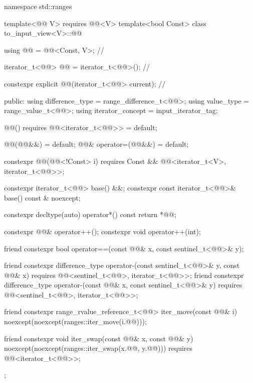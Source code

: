 %
\begin{codeblock}
namespace std::ranges {
  template<@@ V>
    requires @@<V>
  template<bool Const>
  class to_input_view<V>::@@ {
    using @@ = @@<Const, V>;                         // \expos

    iterator_t<@@> @@ = iterator_t<@@>();             // \expos

    constexpr explicit @@(iterator_t<@@> current);      // \expos

  public:
    using difference_type = range_difference_t<@@>;
    using value_type = range_value_t<@@>;
    using iterator_concept = input_iterator_tag;

    @@() requires @@<iterator_t<@@>> = default;

    @@(@@&&) = default;
    @@& operator=(@@&&) = default;

    constexpr @@(@@<!Const> i)
      requires Const && @@<iterator_t<V>, iterator_t<@@>>;

    constexpr iterator_t<@@> base() &&;
    constexpr const iterator_t<@@>& base() const & noexcept;

    constexpr decltype(auto) operator*() const { return *@@; }

    constexpr @@& operator++();
    constexpr void operator++(int);

    friend constexpr bool operator==(const @@& x, const sentinel_t<@@>& y);

    friend constexpr difference_type operator-(const sentinel_t<@@>& y, const @@& x)
      requires @@<sentinel_t<@@>, iterator_t<@@>>;
    friend constexpr difference_type operator-(const @@& x, const sentinel_t<@@>& y)
      requires @@<sentinel_t<@@>, iterator_t<@@>>;

    friend constexpr range_rvalue_reference_t<@@> iter_move(const @@& i)
      noexcept(noexcept(ranges::iter_move(i.@@)));

    friend constexpr void iter_swap(const @@& x, const @@& y)
      noexcept(noexcept(ranges::iter_swap(x.@@, y.@@)))
      requires @@<iterator_t<@@>>;
  };
}
\end{codeblock}


